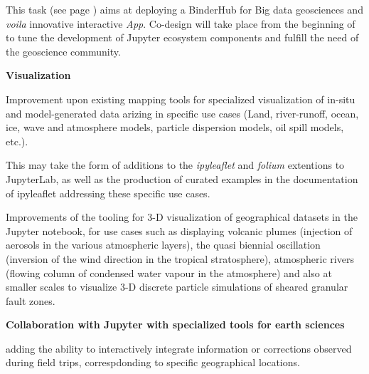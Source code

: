 \begin{task}[
  title=Demonstrator: Geosciences,
  id=geoscience,
  lead=UIO,
  PM=22,
  wphases={0-48},
  partners={EGI,QS,SRL,UPSUD}
]


This task (see page \pageref{sec:concept-demonstrators-geo}) aims at
deploying a BinderHub for Big data geosciences and \emph{voila}
innovative interactive \emph{App}. Co-design will take place from the
beginning of \TheProject to tune the development of Jupyter ecosystem
components and fulfill the need of the geoscience community.

\textbf{Visualization}

\begin{compactitem}
  \item Improvement upon existing mapping tools for specialized
    visualization of in-situ and model-generated data arizing in
    specific use cases (Land, river-runoff, ocean, ice, wave and
    atmosphere models, particle dispersion models, oil spill models,
    etc.).

    This may take the form of additions to the \emph{ipyleaflet} and
    \emph{folium} extentions to JupyterLab, as well as the production of
    curated examples in the documentation of ipyleaflet addressing these
    specific use cases.

  \item Improvements of the tooling for 3-D visualization of
    geographical datasets in the Jupyter notebook, for use cases such as
    displaying volcanic plumes (injection of aerosols in the various
    atmospheric layers), the quasi biennial oscillation (inversion of
    the wind direction in the tropical stratosphere), atmospheric rivers
    (flowing column of condensed water vapour in the atmosphere) and
    also at smaller scales to visualize 3-D discrete particle simulations
    of sheared granular fault zones.
\end{compactitem}

\textbf{Collaboration with Jupyter with specialized tools for earth sciences}

\begin{compactitem}
  \item adding the ability to interactively integrate information or corrections
    observed during field trips, correspdonding to specific geographical locations.


\end{compactitem}
\end{task}
